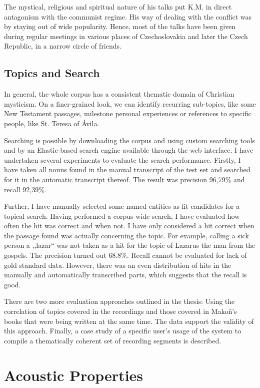 \documentclass[hidelinks,12pt,a4paper]{report}
\begin{document}
The mystical, religious and spiritual nature of his talks put K.M. in
direct antagonism with the communist regime.  His way of dealing
with the conflict was by staying out of wide popularity. Hence, most of the
talks have been given during regular meetings in various places of
Czechoslovakia and later the Czech Republic, in a narrow circle of friends.

\section{Topics and Search}

In general, the whole corpus has a consistent thematic domain of Christian
mysticism. On a finer-grained look, we can identify recurring sub-topics, like
some New Testament passages, milestone personal experiences or references to
specific people, like St. Teresa of \'{A}vila.

Searching is possible by downloading the corpus and using custom searching tools
and by an Elastic-based search engine available through the web interface. I
have undertaken several experiments to evaluate the search performance.
Firstly, I have taken all nouns found in the manual transcript of the test set
and searched for it in the automatic transcript thereof. The result was precision
96,79\% and recall 92,39\%.

Further, I have manually selected some named entities as fit candidates for a
topical search. Having performed a corpus-wide search, I have evaluated how often
the hit was correct and when not. I have only considered a hit correct when the
passage found was actually concerning the topic. For example, calling a sick
person a ,,lazar`` was not taken as a hit for the topic of Lazarus the man from
the gospels. The precision turned out 68.8\%. Recall cannot be evaluated for
lack of gold standard data. However, there was an even distribution of hits in
the manually and automatically transcribed parts, which suggests that the recall
is good.

There are two more evaluation approaches outlined in the thesis: Using the
correlation of topics covered in the recordings and those covered in Makoň's
books that were being written at the same time. The data support the validity of
this approach. Finally, a case study of a specific user's usage of the system to
  compile a thematically coherent set of recording segments is described.

\chapter{Acoustic Properties}
\label{chap:acoustics}
\end{document}
